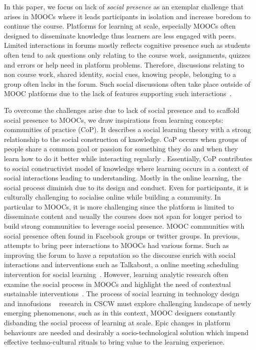 \documentclass[manuscript,screen,review]{acmart}
\begin{document}
In this paper, we focus on lack of \textit{social presence} as an exemplar challenge that arises in MOOCs where it leads participants in isolation and increase boredom to continue the course. Platforms for learning at scale, especially MOOCs often designed to disseminate knowledge thus learners are less engaged with peers. Limited interactions in forums mostly reflects cognitive presence such as students often tend to ask questions only relating to the course work, assignments, quizzes and errors or help need in platform problems. Therefore, discussions relating to non course work, shared identity, social cues, knowing people, belonging to a group often lacks in the forum. Such social discussions often take place outside of MOOC platforms due to the lack of features supporting such interactions~\cite{veletsianos2015digging}. 


To overcome the challenges arise due to lack of social presence and to scaffold social presence to MOOCs, we draw inspirations from learning concepts: communities of practice (CoP). It describes a social learning theory with a strong relationship to the social construction of knowledge. CoP occurs when groups of people share a common goal or passion for something they do and when they learn how to do it better while interacting regularly \cite{wenger1999communities}. Essentially, CoP contributes to social constructivist model of knowledge where learning occurs in a context of social interactions leading to understanding. Mostly in the online learning, the social process diminish due to its design and conduct. Even for participants, it is culturally challenging to socialise online while building a community. In particular to MOOCs, it is more challenging since the platform is limited to disseminate content and usually the courses does not span for longer period to build strong communities to leverage social presence. MOOC communities with social presence often found in Facebook groups or twitter groups. In previous,  attempts to bring peer interactions to MOOCs had various forms. Such as improving the forum to have a reputation so the discourse enrich with social interactions and interventions such as Talkabout, a online meeting scheduling intervention for social learning~\cite{kulkarni2015talkabout}. However, learning analytic research often examine the social process in MOOCs and highlight the need of contextual sustainable interventions~\cite{poquet2018mooc}. The process of social learning in technology design and innofusions ~\cite{williams2005social} research in CSCW  must explore  challenging landscape of newly emerging phenomenons, such as in this context, MOOC designers constantly disbanding the social process of learning at scale. Epic changes in platform behaviours are needed and desirably a socio-technological solution which impend effective techno-cultural rituals to bring value to the learning experience. 
\end{document}
